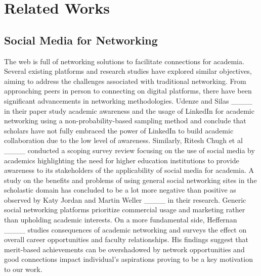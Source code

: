 \section{Related Works}
\subsection{Social Media for Networking} The web is full of networking solutions to facilitate connections for academia. Several existing platforms and research studies have explored similar objectives, aiming to address the challenges associated with traditional networking. From approaching peers in person to connecting on digital platforms, there have been significant advancements in networking methodologies. Udenze and Silas ____ in their paper study academic awareness and the usage of LinkedIn for academic networking using a non-probability-based sampling method and conclude that scholars have not fully embraced the power of LinkedIn to build academic collaboration due to the low level of awareness. Similarly, Ritesh Chugh et al ____ conducted a scoping survey review focusing on the use of social media by academics highlighting the need for higher education institutions to provide awareness to its stakeholders of the applicability of social media for academia. A study on the benefits and problems of using general social networking sites in the scholastic domain has concluded to be a lot more negative than positive as observed by Katy Jordan and Martin Weller ____ in their research. Generic social networking platforms prioritize commercial usage and marketing rather than upholding academic interests. On a more fundamental side, Heffernan ____ studies consequences of academic networking and surveys the effect on overall career opportunities and faculty relationships. His findings suggest that merit-based achievements can be overshadowed by network opportunities and good connections impact individual's aspirations proving to be a key motivation to our work.

